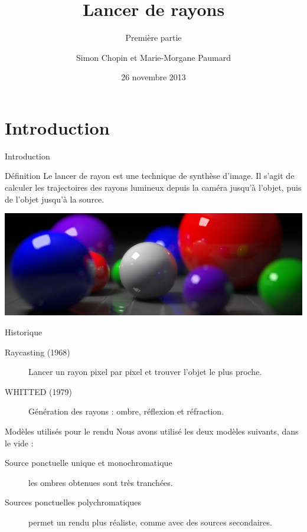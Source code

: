 \documentclass{beamer}
\title{Lancer de rayons}
\subtitle{Première partie}
\author{Simon Chopin et Marie-Morgane Paumard}
\date{26 novembre 2013}
\begin{document}
\begin{frame}
	\titlepage
\end{frame}

\section{Introduction}

\begin{frame}{Introduction}
\begin{alertblock}{Définition}
Le lancer de rayon est une technique de synthèse d'image. Il s'agit de calculer
les trajectoires des rayons lumineux depuis la caméra jusqu'à l'objet, puis de
l'objet jusqu'à la source.
\end{alertblock}

\begin{center}
  \includegraphics[scale=0.2]{img/intro.jpg}
\end{center}

\begin{block}{Historique}
  \begin{description}
    \item[Raycasting (1968)] Lancer un rayon pixel par pixel et trouver l'objet
le plus proche.
    \item[WHITTED (1979)] Génération des rayons : ombre, réflexion et
réfraction.
  \end{description}
\end{block}

\end{frame}

\begin{frame}{Modèles utilisés pour le rendu}
Nous avons utilisé les deux modèles suivants, dans le vide :
\begin{description}
  \item [Source ponctuelle unique et monochromatique] les ombres obtenues sont
très tranchées.
  \item [Sources ponctuelles polychromatiques] permet un rendu plus réaliste,
comme avec des sources secondaires.
\end{description}
\end{frame}
\end{document}
